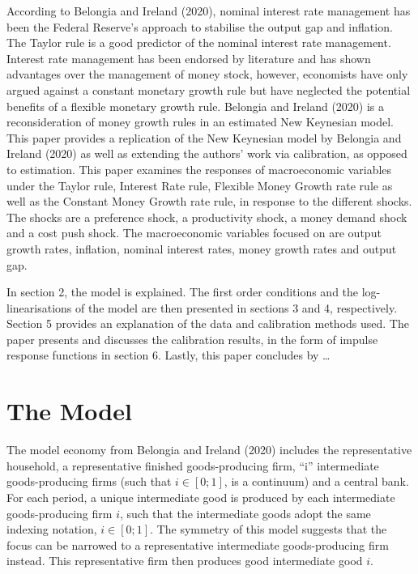 \documentclass[11pt,preprint, authoryear]{elsarticle}
\numberwithin{equation}{section}
\numberwithin{figure}{section}
\numberwithin{table}{section}
\begin{document}
According to Belongia and Ireland (2020), nominal interest rate
management has been the Federal Reserve's approach to stabilise the
output gap and inflation. The Taylor rule is a good predictor of the
nominal interest rate management. Interest rate management has been
endorsed by literature and has shown advantages over the management of
money stock, however, economists have only argued against a constant
monetary growth rule but have neglected the potential benefits of a
flexible monetary growth rule. Belongia and Ireland (2020) is a
reconsideration of money growth rules in an estimated New Keynesian
model. This paper provides a replication of the New Keynesian model by
Belongia and Ireland (2020) as well as extending the authors' work via
calibration, as opposed to estimation. This paper examines the responses
of macroeconomic variables under the Taylor rule, Interest Rate rule,
Flexible Money Growth rate rule as well as the Constant Money Growth
rate rule, in response to the different shocks. The shocks are a
preference shock, a productivity shock, a money demand shock and a cost
push shock. The macroeconomic variables focused on are output growth
rates, inflation, nominal interest rates, money growth rates and output
gap.

In section 2, the model is explained. The first order conditions and the
log-linearisations of the model are then presented in sections 3 and 4,
respectively. Section 5 provides an explanation of the data and
calibration methods used. The paper presents and discusses the
calibration results, in the form of impulse response functions in
section 6. Lastly, this paper concludes by \ldots{}

\hypertarget{the-model}{%
\section{The Model}\label{the-model}}

The model economy from Belongia and Ireland (2020) includes the
representative household, a representative finished goods-producing
firm, ``i'' intermediate goods-producing firms (such that
\(i \in [0; 1]\), is a continuum) and a central bank. For each period, a
unique intermediate good is produced by each intermediate
goods-producing firm \(i\), such that the intermediate goods adopt the
same indexing notation, \(i \in [0; 1]\). The symmetry of this model
suggests that the focus can be narrowed to a representative intermediate
goods-producing firm instead. This representative firm then produces
good intermediate good \(i\).
\end{document}
